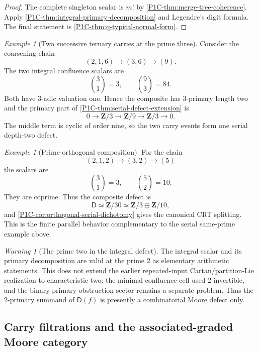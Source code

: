 \documentclass[11pt]{article}
\theoremstyle{remark}
\newtheorem{warning}[theorem]{Warning}
\newtheorem{example}[theorem]{Example}
\newcommand{\Z}{\mathbf Z}
\begin{document}
\begin{proof}
The complete singleton scalar is $m!$ by \cref{P1C-thm:merge-tree-coherence}. Apply
\cref{P1C-thm:integral-primary-decomposition} and Legendre's digit formula. The final statement is
\cref{P1C-thm:q-typical-normal-form}.
\end{proof}


\begin{example}[Two successive ternary carries at the prime three]
Consider the coarsening chain
\[
 (2,1,6)\longrightarrow(3,6)\longrightarrow(9).
\]
The two integral confluence scalars are
\[
 \binom31=3,
 \qquad
 \binom93=84.
\]
Both have $3$-adic valuation one.  Hence the composite has $3$-primary length two and the
primary part of \cref{P1C-thm:serial-defect-extension} is
\[
 \boxed{
 0\longrightarrow\Z/3
 \longrightarrow\Z/9
 \longrightarrow\Z/3
 \longrightarrow0.}
\]
The middle term is cyclic of order nine, so the two carry events form one serial depth-two defect.
\end{example}

\begin{example}[Prime-orthogonal composition]
For the chain
\[
 (2,1,2)\longrightarrow(3,2)\longrightarrow(5)
\]
the scalars are
\[
 \binom31=3,
 \qquad
 \binom52=10.
\]
They are coprime.  Thus the composite defect is
\[
 \mathsf D\simeq\Z/30
 \simeq\Z/3\oplus\Z/10,
\]
and \cref{P1C-cor:orthogonal-serial-dichotomy} gives the canonical CRT splitting.  This is the
finite parallel behavior complementary to the serial same-prime example above.
\end{example}

\begin{warning}[The prime two in the integral defect]\label{P1C-warn:two-primary-integral-defect}
The integral scalar and its primary decomposition are valid at the prime $2$ as elementary
arithmetic statements. This does not extend the earlier repeated-input Cartan/partition-Lie
realization to characteristic two: the minimal confluence cell used $2$ invertible, and the binary
primary obstruction sector remains a separate problem. Thus the $2$-primary summand of
$\mathsf D(f)$ is presently a combinatorial Moore defect only.
\end{warning}


\subsection{Carry filtrations and the associated-graded Moore category}
\end{document}
